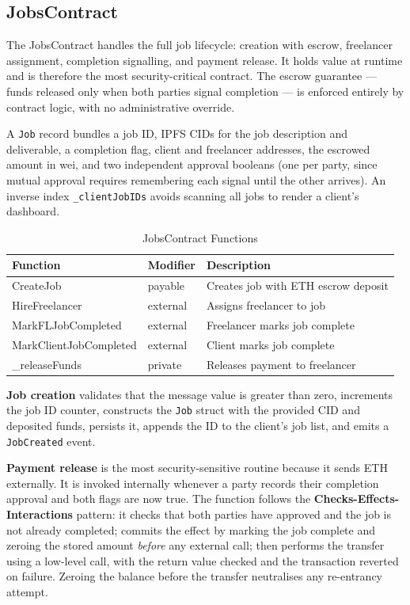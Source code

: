 \subsection{JobsContract}

The JobsContract handles the full job lifecycle: creation with escrow, freelancer assignment, completion signalling, and payment release. It holds value at runtime and is therefore the most security-critical contract. The escrow guarantee --- funds released only when both parties signal completion --- is enforced entirely by contract logic, with no administrative override.

A \texttt{Job} record bundles a job ID, IPFS CIDs for the job description and deliverable, a completion flag, client and freelancer addresses, the escrowed amount in wei, and two independent approval booleans (one per party, since mutual approval requires remembering each signal until the other arrives). An inverse index \texttt{\_clientJobIDs} avoids scanning all jobs to render a client's dashboard.

\begin{table}[H]
\centering
\caption{JobsContract Functions}
\begin{tabular}{|p{4cm}|p{2.5cm}|p{6cm}|}
\hline
\textbf{Function} & \textbf{Modifier} & \textbf{Description} \\
\hline
CreateJob & payable & Creates job with ETH escrow deposit \\
\hline
HireFreelancer & external & Assigns freelancer to job \\
\hline
MarkFLJobCompleted & external & Freelancer marks job complete \\
\hline
MarkClientJobCompleted & external & Client marks job complete \\
\hline
\_releaseFunds & private & Releases payment to freelancer \\
\hline
\end{tabular}
\end{table}

\textbf{Job creation} validates that the message value is greater than zero, increments the job ID counter, constructs the \texttt{Job} struct with the provided CID and deposited funds, persists it, appends the ID to the client's job list, and emits a \texttt{JobCreated} event.

\textbf{Payment release} is the most security-sensitive routine because it sends ETH externally. It is invoked internally whenever a party records their completion approval and both flags are now true. The function follows the \textbf{Checks-Effects-Interactions} pattern: it checks that both parties have approved and the job is not already completed; commits the effect by marking the job complete and zeroing the stored amount \emph{before} any external call; then performs the transfer using a low-level call, with the return value checked and the transaction reverted on failure. Zeroing the balance before the transfer neutralises any re-entrancy attempt.

